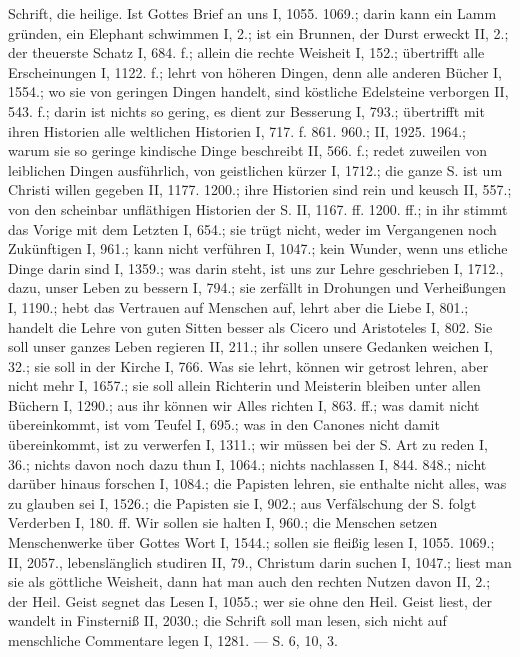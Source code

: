 Schrift, die heilige. Ist Gottes Brief an uns I, 1055. 1069.; darin kann ein Lamm gründen, ein Elephant schwimmen I, 2.; ist ein Brunnen, der Durst erweckt II, 2.; der theuerste Schatz I, 684. f.; allein die rechte Weisheit I, 152.; übertrifft alle Erscheinungen I, 1122. f.; lehrt von höheren Dingen, denn alle anderen Bücher I, 1554.; wo sie von geringen Dingen handelt, sind köstliche Edelsteine verborgen II, 543. f.; darin ist nichts so gering, es dient zur Besserung I, 793.; übertrifft mit ihren Historien alle weltlichen Historien I, 717. f. 861. 960.; II, 1925. 1964.; warum sie so geringe kindische Dinge beschreibt II, 566. f.; redet zuweilen von leiblichen Dingen ausführlich, von geistlichen kürzer I, 1712.; die ganze S. ist um Christi willen gegeben II, 1177. 1200.; ihre Historien sind rein und keusch II, 557.; von den scheinbar unfläthigen Historien der S. II, 1167. ff. 1200. ff.; in ihr stimmt das Vorige mit dem Letzten I, 654.; sie trügt nicht, weder im Vergangenen noch Zukünftigen I, 961.; kann nicht verführen I, 1047.; kein Wunder, wenn uns etliche Dinge darin  sind I, 1359.; was darin steht, ist uns zur Lehre geschrieben I, 1712.,  dazu, unser Leben zu bessern I, 794.; sie zerfällt in Drohungen und Verheißungen I, 1190.; hebt das Vertrauen auf Menschen auf, lehrt aber die Liebe I, 801.; handelt die Lehre von guten Sitten besser als Cicero und Aristoteles I, 802. Sie soll unser ganzes Leben regieren II, 211.; ihr sollen unsere Gedanken weichen I, 32.; sie soll in der Kirche  I, 766. Was sie lehrt, können wir getrost lehren, aber nicht mehr I, 1657.; sie soll allein Richterin und Meisterin bleiben unter allen Büchern I, 1290.; aus ihr können wir Alles richten I, 863. ff.; was damit nicht übereinkommt, ist vom Teufel I, 695.; was in den Canones nicht damit übereinkommt, ist zu verwerfen I, 1311.; wir müssen bei der S. Art zu reden  I, 36.; nichts davon noch dazu thun I, 1064.; nichts nachlassen I, 844. 848.; nicht darüber hinaus forschen I, 1084.; die Papisten lehren, sie enthalte nicht alles, was zu glauben sei I, 1526.; die Papisten  sie I, 902.; aus Verfälschung der S. folgt Verderben I, 180. ff. Wir sollen sie  halten I, 960.; die Menschen setzen Menschenwerke über Gottes Wort I, 1544.; sollen sie fleißig lesen I, 1055. 1069.; II, 2057., lebenslänglich studiren II, 79., Christum darin suchen I, 1047.; liest man sie als göttliche Weisheit, dann hat man auch den rechten Nutzen davon II, 2.; der Heil. Geist segnet das Lesen I, 1055.; wer sie ohne den Heil. Geist liest, der wandelt in Finsterniß II, 2030.; die Schrift soll man lesen, sich nicht auf menschliche Commentare legen I, 1281. — S.  6,  10,  3.

